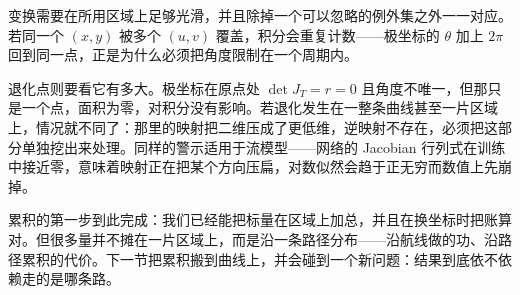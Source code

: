 变换需要在所用区域上足够光滑，并且除掉一个可以忽略的例外集之外一一对应。若同一个 \((x,y)\) 被多个 \((u,v)\) 覆盖，积分会重复计数——极坐标的 \(\theta\) 加上 \(2\pi\) 回到同一点，正是为什么必须把角度限制在一个周期内。

退化点则要看它有多大。极坐标在原点处 \(\det J_T=r=0\) 且角度不唯一，但那只是一个点，面积为零，对积分没有影响。若退化发生在一整条曲线甚至一片区域上，情况就不同了：那里的映射把二维压成了更低维，逆映射不存在，必须把这部分单独挖出来处理。同样的警示适用于流模型——网络的 Jacobian 行列式在训练中接近零，意味着映射正在把某个方向压扁，对数似然会趋于正无穷而数值上先崩掉。

累积的第一步到此完成：我们已经能把标量在区域上加总，并且在换坐标时把账算对。但很多量并不摊在一片区域上，而是沿一条路径分布——沿航线做的功、沿路径累积的代价。下一节把累积搬到曲线上，并会碰到一个新问题：结果到底依不依赖走的是哪条路。

